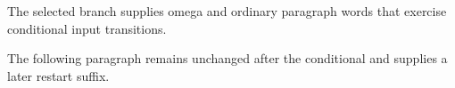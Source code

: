 
\hsize=220pt \vsize=240pt
\iffalse
The selected branch supplies alpha and ordinary paragraph words that exercise conditional input transitions.
\else
The selected branch supplies omega and ordinary paragraph words that exercise conditional input transitions.
\fi

The following paragraph remains unchanged after the conditional and supplies a later restart suffix.
\bye
